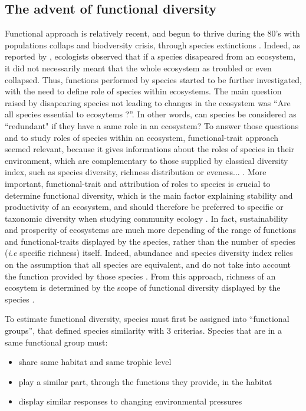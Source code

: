 \subsection{The advent of functional diversity}
Functional approach is relatively recent, and begun to thrive during the 80's with populations collaps and biodversity crisis, through species extinctions \citep{wilson1988}. Indeed, as reported by \citep{mejri2009}, ecologists observed that if a species disapeared from an ecosystem, it did not necessarily meant that the whole ecosystem as troubled or even collapsed. Thus, functions performed by species started to be further investigated, with the need to define role of species within ecosystems. The main question raised by disapearing species not leading to changes in the ecosystem was ``Are all species essential to ecosytems ?''. In other words, can species be considered as ``redundant" if they have a same role in an ecosystem? To answer those questions and to study roles of species within an ecosystem, functional-trait approach seemed relevant, because it gives informations about the roles of species in their environment, which are complementary to those supplied by classical diversity index, such as species diversity, richness distribution or eveness... \citep{marcon2015,mejri2009}. More important, functional-trait and attribution of roles to species is crucial to determine functional diversity, which is the main factor explaining stability and productivity of an ecosystem, and should therefore be preferred to specific or taxonomic diversity when studying community ecology \citep{dumay2004,mejri2009}. In fact, sustainability and prosperity of ecosystems are much more depending of the range of functions and functional-traits displayed by the species, rather than the number of species (\textit{i.e} specific richness) itself. Indeed, abundance and species diversity index relies on the assumption that all species are equivalent, and do not take into account the function provided by those species \citep{mejri2009}. From this approach, richness of an ecosytem is determined by the scope of functional diversity displayed by the species \citep{rocklin2004}. 

To estimate functional diversity, species must first be assigned into ``functional groups'', that defined species similarity with 3 criterias. Species that are in a same functional group must: 
\begin{itemize}
\item share same habitat and same trophic level \citep{brindamour2016}
\item play a similar part, through the functions they provide, in the habitat \citep{dumay2004,mejri2009}
\item display similar responses to changing environmental pressures \citep{dumay2004,mejri2009,brindamour2016}
\end{itemize}

